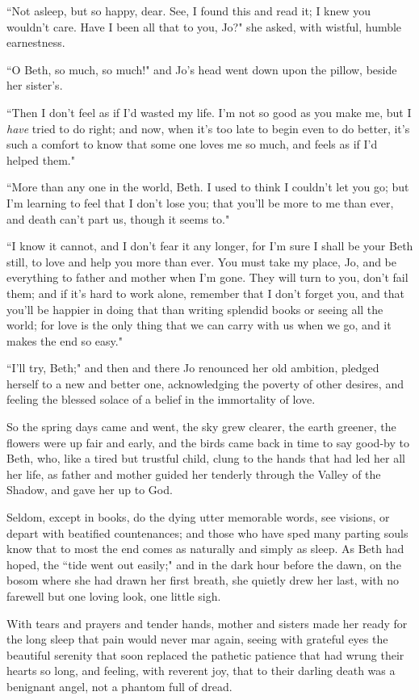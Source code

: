 ``Not asleep, but so happy, dear. See, I found this and read it; I knew
you wouldn't care. Have I been all that to you, Jo?" she
asked, with wistful, humble earnestness.

``O Beth, so much, so much!" and Jo's head went down upon
the pillow, beside her sister's.

``Then I don't feel as if I'd wasted my
life. I'm not so good as you make me, but I \emph{have}
tried to do right; and now, when it's too late to begin
even to do better, it's such a comfort to know that some
one loves me so much, and feels as if I'd helped them."

``More than any one in the world, Beth. I used to think I
couldn't let you go; but I'm learning to
feel that I don't lose you; that you'll
be more to me than ever, and death can't part us, though
it seems to."

``I know it cannot, and I don't fear it any longer, for
I'm sure I shall be your Beth still, to love and help
you more than ever. You must take my place, Jo, and be everything to
father and mother when I'm gone. They will turn to you,
don't fail them; and if it's hard to
work alone, remember that I don't forget you, and that
you'll be happier in doing that than writing splendid
books or seeing all the world; for love is the only thing that we can
carry with us when we go, and it makes the end so easy."

``I'll try, Beth;" and then and there Jo renounced her
old ambition, pledged herself to a new and better one, acknowledging the
poverty of other desires, and feeling the blessed solace of a belief in
the immortality of love.

So the spring days came and went, the sky grew clearer, the earth
greener, the flowers were up fair and early, and the birds came back in
time to say good-by to Beth, who, like a tired but trustful child, clung
to the hands that had led her all her life, as father and mother guided
her tenderly through the Valley of the Shadow, and gave her up to God.

Seldom, except in books, do the dying utter memorable words, see
visions, or depart with beatified countenances; and those who have sped
many parting souls know that to most the end comes as naturally and
simply as sleep. As Beth had hoped, the ``tide went out easily;" and in
the dark hour before the dawn, on the bosom where she had drawn her
first breath, she quietly drew her last, with no farewell but one loving
look, one little sigh.

With tears and prayers and tender hands, mother and sisters made her
ready for the long sleep that pain would never mar again, seeing with
grateful eyes the beautiful serenity that soon replaced the pathetic
patience that had wrung their hearts so long, and feeling, with reverent
joy, that to their darling death was a benignant angel, not a phantom
full of dread.

